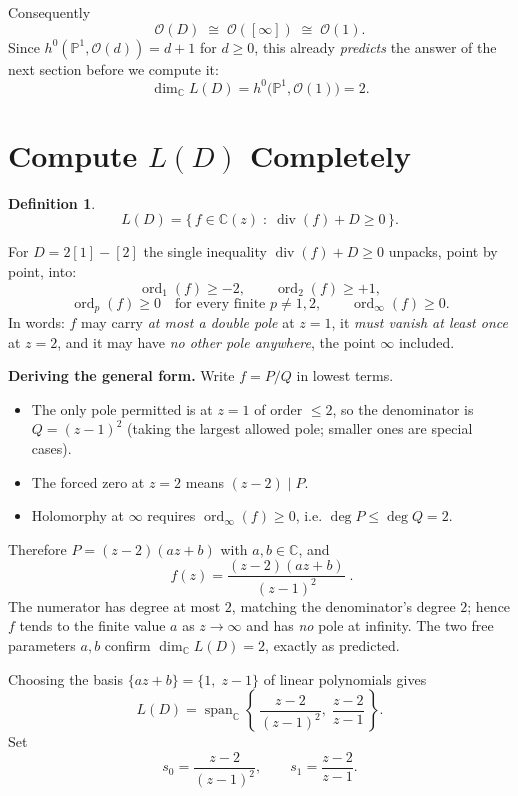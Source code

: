 \documentclass[11pt]{article}
\newcommand{\PP}{\mathbb P}
\newcommand{\CC}{\mathbb C}
\newcommand{\OO}{\mathcal O}
\newcommand{\divisor}{\operatorname{div}}
\newcommand{\ord}{\operatorname{ord}}
\theoremstyle{definition}
\newtheorem{definition}{Definition}
\theoremstyle{plain}
\begin{document}
\noindent
Consequently
\[
  \OO(D)\;\cong\;\OO([\infty])\;\cong\;\OO(1).
\]
Since \(h^0(\PP^1,\OO(d))=d+1\) for \(d\ge0\), this already \emph{predicts} the
answer of the next section before we compute it:
\[
  \dim_{\CC}L(D)=h^0\bigl(\PP^1,\OO(1)\bigr)=2 .
\]

\section{Compute \(L(D)\) Completely}
\begin{definition}
\[
  L(D)=\bigl\{\,f\in\CC(z)\;:\;\divisor(f)+D\ge 0\,\bigr\}.
\]
\end{definition}

\noindent
For \(D=2[1]-[2]\) the single inequality \(\divisor(f)+D\ge0\) unpacks, point by
point, into:
\[
  \ord_1(f)\ge -2,\qquad
  \ord_2(f)\ge +1,
\]
\[
  \ord_p(f)\ge 0 \quad\text{for every finite } p\neq 1,2,
  \qquad
  \ord_\infty(f)\ge 0 .
\]
In words: \(f\) may carry \emph{at most a double pole} at \(z=1\), it
\emph{must vanish at least once} at \(z=2\), and it may have \emph{no other
pole anywhere}, the point \(\infty\) included.

\medskip
\noindent\textbf{Deriving the general form.}
Write \(f=P/Q\) in lowest terms.
\begin{itemize}
  \item The only pole permitted is at \(z=1\) of order \(\le2\), so the
        denominator is \(Q=(z-1)^2\) (taking the largest allowed pole; smaller
        ones are special cases).
  \item The forced zero at \(z=2\) means \((z-2)\mid P\).
  \item Holomorphy at \(\infty\) requires \(\ord_\infty(f)\ge0\), i.e.
        \(\deg P\le\deg Q=2\).
\end{itemize}
Therefore \(P=(z-2)(az+b)\) with \(a,b\in\CC\), and
\[
  \boxed{\;f(z)=\frac{(z-2)(az+b)}{(z-1)^2}\;}.
\]
The numerator has degree at most \(2\), matching the denominator's degree \(2\);
hence \(f\) tends to the finite value \(a\) as \(z\to\infty\) and has \emph{no}
pole at infinity. The two free parameters \(a,b\) confirm \(\dim_\CC L(D)=2\),
exactly as predicted.

\medskip
\noindent
Choosing the basis \(\{az+b\}=\{1,\;z-1\}\) of linear polynomials gives
\[
  L(D)=\operatorname{span}_{\CC}
  \left\{\,
    \frac{z-2}{(z-1)^2},\;
    \frac{z-2}{z-1}
  \,\right\}.
\]
Set
\[
  s_0=\frac{z-2}{(z-1)^2},
  \qquad
  s_1=\frac{z-2}{z-1}.
\]
\end{document}
